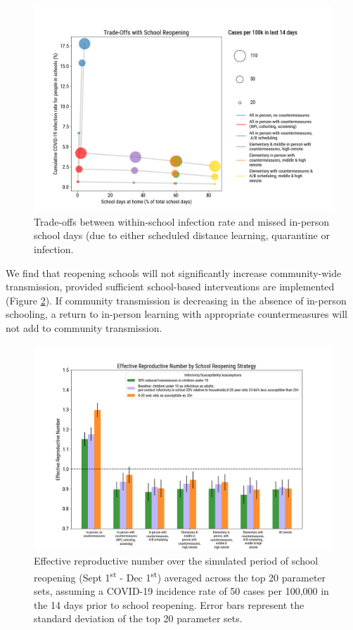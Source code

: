 \documentclass[preprint,12pt]{elsarticle}
\begin{document}
\begin{figure}[h]
    \centering
    \includegraphics[scale=0.48]{tradeoffs_2020-08-06.png}
    \caption{Trade-offs between within-school infection rate and missed in-person school days (due to either scheduled distance learning, quarantine or infection.}
    \label{fig:tradeoffs}
\end{figure}

We find that reopening schools will not significantly increase community-wide transmission, provided sufficient school-based interventions are implemented (Figure \ref{fig:reff}). If community transmission is decreasing in the absence of in-person schooling, a return to in-person learning with appropriate countermeasures will not add to community transmission. 

\begin{figure}[h]
    \centering
    \includegraphics[scale=0.4]{r_eff_2020-08-13.png}
    \caption{Effective reproductive number over the simulated period of school reopening (Sept 1\textsuperscript{st} - Dec 1\textsuperscript{st}) averaged across the top 20 parameter sets, assuming a COVID-19 incidence rate of 50 cases per 100,000 in the 14 days prior to school reopening. Error bars represent the standard deviation of the top 20 parameter sets.}
    \label{fig:reff}
\end{figure}
\end{document}
